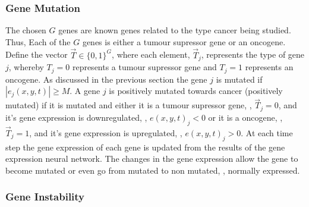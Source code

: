 \documentclass[\main/thesis.tex]{subfiles}
\begin{document}
\subsubsection{Gene Mutation}

The chosen $G$ genes are known genes related to the type cancer being studied.
Thus, Each of the $G$ genes is either a tumour supressor gene or an oncogene.
Define the vector $\vec{T} {\in} \{ 0, 1 \}^G$, where each element, 
$\vec{T}_{j}$, represents the type of gene $j$, whereby $T_{j} {=} 0$ represents 
a tumour supressor gene and $T_{j} {=} 1$ represents an oncogene.
As discussed in the previous section the gene $j$ is mutated if
$|e_j(x, y, t)| {\ge} M$. A gene $j$ is positively mutated towards cancer 
(positively mutated) if it is mutated and either it is a tumour supressor gene, 
\ie, $\vec{T}_j {=} 0$, and it's gene expression is downregulated, \ie,
$e(x, y, t)_j < 0$ or it is a oncogene, \ie, $\vec{T}_j {=} 1$, and
it's gene expression is upregulated, \ie, $e(x, y, t)_j > 0$.      
At each time step the gene expression of each gene is updated from the results 
of the gene expression neural network. The changes in the gene expression allow 
the gene to become mutated or even go from mutated to non mutated, \ie, normally 
expressed. 

\subsubsection{Gene Instability}
\end{document}
